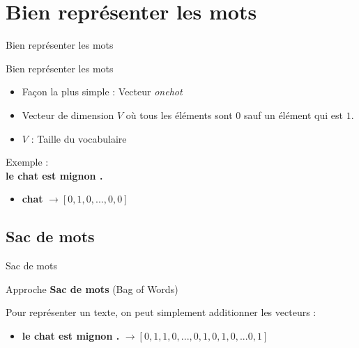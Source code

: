 \documentclass[french]{beamer}
\begin{document}
\section{Bien représenter les mots}

\begin{frame}{}

\centering
{\Huge Bien représenter les mots}

\end{frame}

\begin{frame}{Bien représenter les mots}
\begin{itemize}
	\item Façon la plus simple : Vecteur \textit{onehot}
	\item Vecteur de dimension $V$ où tous les éléments sont $0$ sauf un élément qui est $1$.
	\item $V$ : Taille du vocabulaire
\end{itemize}

\vspace{.5cm}
Exemple : \\ 
\centering
\textbf{\large le chat est mignon .}

\vspace{.5cm}
\raggedleft
\begin{itemize}
	\item \textbf{chat} $\rightarrow [0, 1, 0, ..., 0, 0]$
\end{itemize}
\end{frame}


\subsection{Sac de mots}

\begin{frame}{Sac de mots}

\centering
{\Large Approche \textbf{Sac de mots} (Bag of Words)}
\vspace{.5cm}

\raggedright
Pour représenter un texte, on peut simplement additionner les vecteurs :

\begin{itemize}
	\item \textbf{le chat est mignon . } $ \rightarrow [0, 1, 1, 0, ..., 0, 1, 0, 1, 0, ... 0, 1]$
\end{itemize}

\end{frame}
\end{document}
